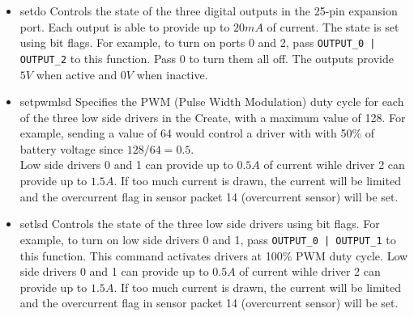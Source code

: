 \documentclass {article}
\begin{document}
\begin {itemize}
  \item {} {setdo}
        Controls the state of the three digital outputs in the 25-pin expansion port.  Each output
        is able to provide up to $20mA$ of current.  The state is set using bit flags.  For example,
        to turn on ports 0 and 2, pass {\tt OUTPUT\_0 | OUTPUT\_2} to this function.  Pass 0 to turn
        them all off. The outputs provide $5V$ when active and $0V$ when inactive. \\
        \retnorm

  \item {} {setpwmlsd}
        Specifies the PWM (Pulse Width Modulation) duty cycle for each of the three low side drivers
        in the Create, with a maximum value of 128.  For example, sending a value of 64 would
        control a driver with with 50\% of battery voltage since $128/64 = 0.5$. \\
        Low side drivers 0 and 1 can provide up to $0.5A$ of current wihle driver 2 can provide up
        to $1.5A$.  If too much current is drawn, the current will be limited and the overcurrent
        flag in sensor packet 14 (overcurrent sensor) will be set. \\
        \retnorm

  \item {} {setlsd}
        Controls the state of the three low side drivers using bit flags.  For example, to turn on
        low side drivers 0 and 1, pass {\tt OUTPUT\_0 | OUTPUT\_1} to this function.  This command
        activates drivers at 100\% PWM duty cycle.  Low side drivers 0 and 1 can provide up to
        $0.5A$ of current wihle driver 2 can provide up to $1.5A$.  If too much current is drawn,
        the current will be limited and the overcurrent flag in sensor packet 14 (overcurrent
        sensor) will be set. \\
        \retnorm


\end{itemize}
\end{document}
